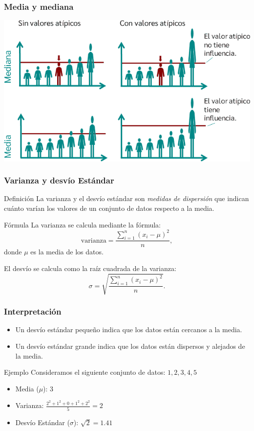 \documentclass[aspectratio=169,12pt]{beamer}
\begin{document}

\begin{frame}
\frametitle{Media y mediana}

\begin{center}
\includegraphics[scale=0.6]{clase2-img-alturas.png}
\end{center}
\end{frame}


\begin{frame}
\frametitle{Varianza y desvío Estándar}
\begin{block}{Definición}
La varianza y el desvío estándar son \emph{medidas de dispersión} que indican cuánto varían los valores de un conjunto de datos respecto a la media.
\end{block}

\begin{block}{Fórmula}
La varianza se calcula mediante la fórmula:
\[ \text{varianza} = \frac{\sum_{i=1}^{n}(x_i - \mu)^2}{n}, \]
donde $\mu$ es la media de los datos.

El desvío se calcula como la raíz cuadrada de la varianza:
\[ \sigma = \sqrt{\frac{\sum_{i=1}^{n}(x_i - \mu)^2}{n}}. \]
\end{block}
\end{frame}

\begin{frame}
\frametitle{Interpretación}
\begin{itemize}
    \item Un desvío estándar pequeño indica que los datos están cercanos a la media.
    \item Un desvío estándar grande indica que los datos están dispersos y alejados de la media.
\end{itemize}

\begin{block}{Ejemplo}
Consideramos el siguiente conjunto de datos: $1, 2, 3, 4, 5$
\begin{itemize}
    \item Media ($\mu$): 3
    \item Varianza: $\frac{2^2 + 1^2 + 0 + 1^2 + 2^2}{5} = 2$
    \item Desvío Estándar ($\sigma$): $\sqrt{2} = 1.41$
\end{itemize}
\end{block}
\end{frame}

\end{document}
